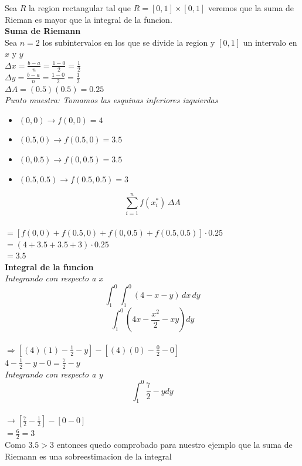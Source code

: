 \begin{respuesta}
     Sea $R$ la region rectangular tal que $R = [0,1] \times [0,1]$ veremos que la suma de Rieman es mayor que la integral de la funcion.\\
     \textbf{Suma de Riemann}\\
     Sea $n=2$ los subintervalos en los que se divide la region y $[0,1]$ un intervalo en $x$ y $y$\\
     $\Delta x= \frac{b-a}{n} = \frac{1-0}{2}=\frac{1}{2} $\\
     $\Delta y= \frac{b-a}{n} = \frac{1-0}{2}=\frac{1}{2} $\\
     $\Delta A =(0.5)(0.5)= 0.25$\\
     \textit{Punto muestra: Tomamos las esquinas inferiores izquierdas}\\
     \begin{itemize}
          \item $(0,0) \longrightarrow f(0,0) = 4$
          \item $(0.5,0) \longrightarrow f(0.5,0) = 3.5$
          \item $(0,0.5) \longrightarrow f(0,0.5) = 3.5$
          \item $(0.5,0.5) \longrightarrow f(0.5,0.5) = 3$
     \end{itemize}
     $$\sum_{i=1}^{n} f(x_i^*)\,\Delta A$$\\
     $ = [f(0,0) + f(0.5,0) + f(0,0.5) + f(0.5,0.5)] \cdot 0.25 $\\
     $=(4 + 3.5 + 3.5 + 3) \cdot 0.25$\\
     $=3.5$\\
     \textbf{Integral de la funcion}\\
     \textit{Integrando con respecto a x}\\
     $$\int_{1}^{0} \int_{1}^{0} (4-x-y)\, dx\, dy$$
     $$\int_{1}^{0} (4x - \frac{x^2}{2} -xy) dy$$\\
     $\Longrightarrow[(4)(1) - \frac{1}{2} - y] - [(4)(0) - \frac{0}{2} - 0]$\\
     $4 - \frac{1}{2}-y - 0 = \frac{7}{2} - y$\\
     \textit{Integrando con respecto a y}\\
     $$\int_{1}^{0} \frac{7}{2} - y dy$$\\
     $ \longrightarrow [\frac{7}{2} - \frac{1}{2}] - [0-0]$\\
     $ = \frac{6}{2} = 3$\\
     Como $3.5 > 3$ entonces quedo comprobado para nuestro ejemplo que la suma de Riemann es una sobreestimacion de la integral
\end{respuesta}
